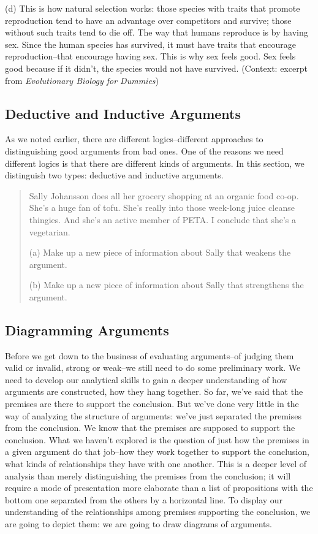 (d) This is how natural selection works: those species with traits that promote reproduction
tend to have an advantage over competitors and survive; those without such traits tend to
die off. The way that humans reproduce is by having sex. Since the human species has
survived, it must have traits that encourage reproduction--that encourage having sex. This
is why sex feels good. Sex feels good because if it didn't, the species would not have
survived. (Context: excerpt from \emph{Evolutionary Biology for Dummies})

\subsection{Deductive and Inductive Arguments}

As we noted earlier, there are different logics--different approaches to distinguishing good
arguments from bad ones. One of the reasons we need different logics is that there are different
kinds of arguments. In this section, we distinguish two types: deductive and inductive arguments.

\begin{quotation}
Sally Johansson does all her grocery shopping at an organic food co-op. She's a huge fan
of tofu. She's really into those week-long juice cleanse thingies. And she's an active
member of PETA. I conclude that she's a vegetarian.

(a) Make up a new piece of information about Sally that weakens the argument.

(b) Make up a new piece of information about Sally that strengthens the argument.
\end{quotation}

\subsection{Diagramming Arguments}
Before we get down to the business of evaluating arguments--of judging them valid or invalid,
strong or weak--we still need to do some preliminary work. We need to develop our analytical
skills to gain a deeper understanding of how arguments are constructed, how they hang together.
So far, we've said that the premises are there to support the conclusion. But we've done very little
in the way of analyzing the structure of arguments: we've just separated the premises from the
conclusion. We know that the premises are supposed to support the conclusion. What we haven't
explored is the question of just how the premises in a given argument do that job--how they work
together to support the conclusion, what kinds of relationships they have with one another. This is
a deeper level of analysis than merely distinguishing the premises from the conclusion; it will
require a mode of presentation more elaborate than a list of propositions with the bottom one
separated from the others by a horizontal line. To display our understanding of the relationships
among premises supporting the conclusion, we are going to depict them: we are going to draw
diagrams of arguments.

